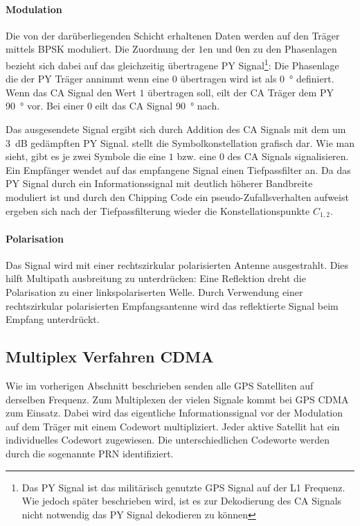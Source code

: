 \paragraph{Modulation}
Die von der darüberliegenden Schicht erhaltenen Daten werden auf den Träger mittels \gls{BPSK} moduliert. Die Zuordnung der $1$en und $0$en zu den Phasenlagen bezieht sich dabei auf das gleichzeitig übertragene \gls{PY} Signal\footnote{Das \gls{PY} Signal ist das militärisch genutzte GPS Signal auf der L1 Frequenz. Wie jedoch später beschrieben wird, ist es zur Dekodierung des \gls{CA} Signals nicht notwendig das \gls{PY} Signal dekodieren zu können}: Die Phasenlage die der \gls{PY} Träger annimmt wenn eine $0$ übertragen wird ist als \SI{0}{\degree} definiert. Wenn das \gls{CA} Signal den Wert $1$ übertragen soll, eilt der \gls{CA} Träger dem \gls{PY} \SI{90}{\degree} vor. Bei einer $0$ eilt das CA Signal \SI{90}{\degree} nach.

Das ausgesendete Signal ergibt sich durch Addition des \gls{CA} Signals mit dem um \SI{3}{\dB} gedämpften \gls{PY} Signal.  stellt die Symbolkonstellation grafisch dar. Wie man sieht, gibt es je zwei Symbole die eine $1$ bzw. eine $0$ des CA Signals signalisieren. Ein Empfänger wendet auf das empfangene Signal einen Tiefpassfilter an. Da das \gls{PY} Signal durch ein Informationssignal mit deutlich höherer Bandbreite moduliert ist und durch den Chipping Code ein pseudo-Zufallsverhalten aufweist ergeben sich nach der Tiefpassfilterung wieder die Konstellationspunkte $C_{1,2}$.


\paragraph{Polarisation} Das Signal wird mit einer rechtszirkular polarisierten Antenne ausgestrahlt. Dies hilft Multipath ausbreitung zu unterdrücken: Eine Reflektion dreht die Polarisation zu einer linkspolariserten Welle. Durch Verwendung einer rechtszirkular polarisierten Empfangsantenne wird das reflektierte Signal beim Empfang unterdrückt.

\subsection{Multiplex Verfahren \gls{CDMA}}
Wie im vorherigen Abschnitt beschrieben senden alle GPS Satelliten auf derselben Frequenz. Zum Multiplexen der vielen Signale kommt bei GPS \gls{CDMA} zum Einsatz. Dabei wird das eigentliche Informationssignal vor der Modulation auf dem Träger mit einem Codewort multipliziert. Jeder aktive Satellit hat ein individuelles Codewort zugewiesen. Die unterschiedlichen Codeworte werden durch die sogenannte \gls{PRN} identifiziert. 

